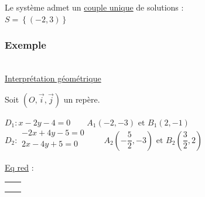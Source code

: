 Le système admet un \underline{couple unique} de solutions : \\

$S=\left\lbrace(-2,3)\right\rbrace$  

\newpage


\subsubsection{Exemple }

 \\

\underline{Interprétation géométrique}

Soit $(O, \vec{i}, \vec{j})$ un repère. 

$D_1 : x -2y -4 = 0 \qquad A_1 (-2, -3) \textrm { et } B_1(2,-1)$ \\

$D_2 : \begin{array}{r}
                   -2x +4y -5 = 0\\
                   2x  -4y +5 = 0\\ 
                  \end{array} \qquad A_2 (-\dfrac{5}{2}, -3) \textrm { et }            B_2(\dfrac{3}{2},2)$

\underline{Eq red} : 
\begin{tabular}{ll}
\begin{minipage}{5cm}
$D_1$ :  \raisebox{-2ex}{$\quad \begin{cases}
               -2y \!\!\!\!\!\!\!\!&= -x +4\\
                 \quad \; y \!\!\!\!\!\!\!\!&= \dfrac{1}{2}x -2\\
                        \end{cases}$ }\\
\end{minipage}  & 
                   \begin{minipage}{5cm}
                  $D_2$ :   \raisebox{-2ex}{$\quad \begin{cases}
                                           -4y \!\!\!\!\!\!\!\!&= -2x -5\\
                                            \quad \; y \!\!\!\!\!\!\!\!&= \dfrac{1}{2}x +\dfrac{5}{4}\\
                        \end{cases}$ }\\
\end{minipage}\\
\end{tabular}\\

